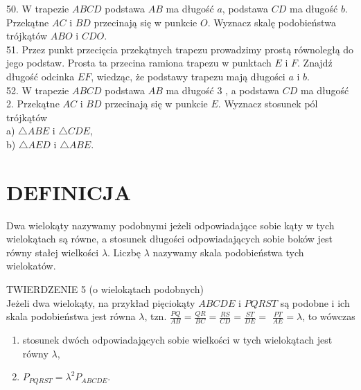 \documentclass[10pt]{article}
\begin{document}
50. W trapezie \(A B C D\) podstawa \(A B\) ma długość \(a\), podstawa \(C D\) ma długość \(b\). Przekątne \(A C\) i \(B D\) przecinają się w punkcie \(O\). Wyznacz skalę podobieństwa trójkątów \(A B O\) i \(C D O\).\\
51. Przez punkt przecięcia przekątnych trapezu prowadzimy prostą równoległą do jego podstaw. Prosta ta przecina ramiona trapezu w punktach \(E\) i \(F\). Znajdź długość odcinka \(E F\), wiedząc, że podstawy trapezu mają długości \(a\) i \(b\).\\
52. W trapezie \(A B C D\) podstawa \(A B\) ma długość 3 , a podstawa \(C D\) ma długość 2. Przekątne \(A C\) i \(B D\) przecinają się w punkcie \(E\). Wyznacz stosunek pól trójkątów\\
a) \(\triangle A B E\) i \(\triangle C D E\),\\
b) \(\triangle A E D\) i \(\triangle A B E\).

\section*{DEFINICJA}
Dwa wielokąty nazywamy podobnymi jeżeli odpowiadające sobie kąty w tych wielokątach są równe, a stosunek długości odpowiadających sobie boków jest równy stałej wielkości \(\lambda\). Liczbę \(\lambda\) nazywamy skala podobieństwa tych wielokatów.

TWIERDZENIE 5 (o wielokątach podobnych)\\
Jeżeli dwa wielokąty, na przykład pięciokąty \(A B C D E\) i \(P Q R S T\) są podobne i ich skala podobieństwa jest równa \(\lambda\), tzn. \(\frac{P Q}{A B}=\frac{Q R}{B C}=\frac{R S}{C D}=\frac{S T}{D E}=\) \(\frac{P T}{A E}=\lambda\), to wówczas

\begin{enumerate}
  \item stosunek dwóch odpowiadających sobie wielkości w tych wielokątach jest równy \(\lambda\),
  \item \(P_{P Q R S T}=\lambda^{2} P_{A B C D E}\).
\end{enumerate}
\end{document}
